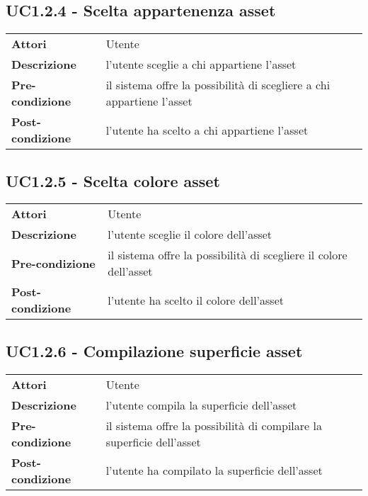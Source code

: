 \subsection{UC1.2.4 - Scelta appartenenza asset}
\label{sssec:UC1.2.4}
\def\arraystretch{1.5}
\begin{tabularx}{\textwidth}{l|p{}}
\rowcolor{I} \multicolumn{2}{c}{\color{white}\textbf{UC1.2.4 - Scelta appartenenza asset}} \\
\toprule
\endhead
\textbf{Attori} & Utente\\
\textbf{Descrizione} & l'utente sceglie a chi appartiene l'asset\\
\textbf{Pre-condizione} & il sistema offre la possibilità di scegliere a chi appartiene l'asset\\
\textbf{Post-condizione} & l'utente ha scelto a chi appartiene l'asset\\
\bottomrule
\end{tabularx}
\subsection{UC1.2.5 - Scelta colore asset}
\label{sssec:UC1.2.5}
\def\arraystretch{1.5}
\begin{tabularx}{\textwidth}{l|p{}}
\rowcolor{I} \multicolumn{2}{c}{\color{white}\textbf{UC1.2.5 - Scelta colore asset}} \\
\toprule
\endhead
\textbf{Attori} & Utente\\
\textbf{Descrizione} & l'utente sceglie il colore dell'asset\\
\textbf{Pre-condizione} & il sistema offre la possibilità di scegliere il colore dell'asset\\
\textbf{Post-condizione} & l'utente ha scelto il colore dell'asset\\
\bottomrule
\end{tabularx}
\subsection{UC1.2.6 - Compilazione superficie asset}
\label{sssec:UC1.2.6}
\def\arraystretch{1.5}
\begin{tabularx}{\textwidth}{l|p{}}
\rowcolor{I} \multicolumn{2}{c}{\color{white}\textbf{UC1.2.6 - Compilazione superficie asset}} \\
\toprule
\endhead
\textbf{Attori} & Utente\\
\textbf{Descrizione} & l'utente compila la superficie dell'asset\\
\textbf{Pre-condizione} & il sistema offre la possibilità di compilare la superficie dell'asset\\
\textbf{Post-condizione} & l'utente ha compilato la superficie dell'asset\\
\bottomrule
\end{tabularx}
